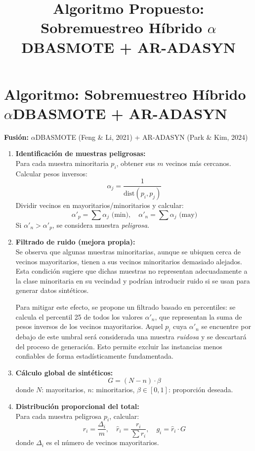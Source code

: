 \documentclass[12pt]{article}
\title{Algoritmo Propuesto: Sobremuestreo Híbrido $\alpha$DBASMOTE + AR-ADASYN}
\date{}
\begin{document}
\maketitle

\section*{Algoritmo: Sobremuestreo Híbrido $\alpha$DBASMOTE + AR-ADASYN}

\textbf{Fusión:} $\alpha$DBASMOTE (Feng \& Li, 2021) + AR-ADASYN (Park \& Kim, 2024)

\begin{enumerate}[label=\textbf{\arabic*.}]
    \item \textbf{Identificación de muestras peligrosas:}\\
    Para cada muestra minoritaria \( p_i \), obtener sus \( m \) vecinos más cercanos. Calcular pesos inversos:
    \[
    \alpha_j = \frac{1}{\text{dist}(p_i, p_j)}
    \]
    Dividir vecinos en mayoritarios/minoritarios y calcular:
    \[
    \alpha'_p = \sum \alpha_j \text{ (min)}, \quad \alpha'_n = \sum \alpha_j \text{ (may)}
    \]
    Si \( \alpha'_n > \alpha'_p \), se considera muestra \emph{peligrosa}.

    \item \textbf{Filtrado de ruido (mejora propia):}\\
    Se observa que algunas muestras minoritarias, aunque se ubiquen cerca de vecinos mayoritarios, tienen a sus vecinos minoritarios demasiado alejados. Esta condición sugiere que dichas muestras no representan adecuadamente a la clase minoritaria en su vecindad y podrían introducir ruido si se usan para generar datos sintéticos. 
    
    Para mitigar este efecto, se propone un filtrado basado en percentiles: se calcula el percentil 25 de todos los valores \( \alpha'_n \), que representan la suma de pesos inversos de los vecinos mayoritarios. Aquel \( p_i \) cuya \( \alpha'_n \) se encuentre por debajo de este umbral será considerada una muestra \emph{ruidosa} y se descartará del proceso de generación. Esto permite excluir las instancias menos confiables de forma estadísticamente fundamentada.
    
    \item \textbf{Cálculo global de sintéticos:}
    \[
    G = (N - n) \cdot \beta
    \]
    donde \( N \): mayoritarios, \( n \): minoritarios, \( \beta \in [0, 1] \): proporción deseada.

    \item \textbf{Distribución proporcional del total:}\\
    Para cada muestra peligrosa \( p_i \), calcular:
    \[
    r_i = \frac{\Delta_i}{m}, \quad \hat{r}_i = \frac{r_i}{\sum r_i}, \quad g_i = \hat{r}_i \cdot G
    \]
    donde \( \Delta_i \) es el número de vecinos mayoritarios.


\end{enumerate}
\end{document}
